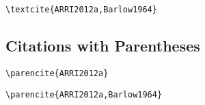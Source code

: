 \begin{lstlisting}[caption={Citation for Multiple Authors.}]
\textcite{ARRI2012a,Barlow1964}
\end{lstlisting}

\textcite{ARRI2012a,Barlow1964}

\subsection*{Citations with Parentheses}
\label{subsec:citations-with-parentheses}

\begin{lstlisting}[caption={Citation with Parentheses for Single Author.}]
\parencite{ARRI2012a}
\end{lstlisting}

\parencite{ARRI2012a}

\begin{lstlisting}[caption={Citation with Parentheses for Multiple Authors.}s]
\parencite{ARRI2012a,Barlow1964}
\end{lstlisting}

\parencite{ARRI2012a,Barlow1964}
